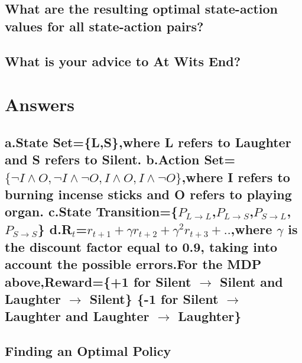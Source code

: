 \documentclass{article}
\begin{document}
\subsection{What are the resulting optimal state-action values for all state-action pairs?}

\subsection{What is your advice to At Wits End?}


\newpage
{}

\section{Answers}

\subsection{a.State Set=\{L,S\},where L refers to Laughter and S refers to Silent.\newline
	     b.Action Set=$\{ \neg I \land O , \neg I \land \neg O,  I \land O, I \land \neg O\}$,where I refers to burning incense sticks and O refers to playing organ.\newline
             c.State Transition=\{$P_{L \to L}$,$P_{L \to S}$,$P_{S \to L}$, $P_{S \to S}$\}\newline
d.R$_{t}$=$r_{t+1} + \gamma r_{t+2} + \gamma ^{2} r_{t+3} +..$,where $\gamma$ is the discount factor equal to 0.9, taking into account the possible errors.\newline For the MDP above,\newline Reward=\{+1 for Silent $\to$ Silent and Laughter $\to$ Silent\} \newline \{-1 for Silent $\to$ Laughter and Laughter $\to$ Laughter\}  }
\subsection{Finding an Optimal Policy}
\end{document}
